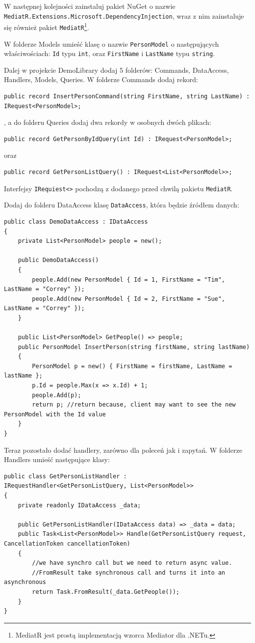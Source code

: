 W następnej kolejności zainstaluj pakiet NuGet o nazwie \texttt{MediatR.Extensions.Microsoft.DependencyInjection}, wraz z nim zainstaluje się również pakiet \texttt{MediatR}\footnote{MediatR jest prostą implementacją wzorca Mediator dla .NETu.}.

W folderze Models umieść klasę o nazwie \texttt{PersonModel} o następujących właściwościach: \texttt{Id} typu \texttt{int}, oraz \texttt{FirstName} i \texttt{LastName} typu \texttt{string}.

Dalej w projekcie DemoLibrary dodaj 5 folderów: Commands, DataAccess, Handlers, Models, Queries. W folderze Commands dodaj rekord:
\begin{lstlisting}
public record InsertPersonCommand(string FirstName, string LastName) : IRequest<PersonModel>;
\end{lstlisting}
, a do folderu Queries dodaj dwa rekordy w osobnych dwóch plikach:
\begin{lstlisting}
public record GetPersonByIdQuery(int Id) : IRequest<PersonModel>;
\end{lstlisting}
oraz
\begin{lstlisting}
public record GetPersonListQuery() : IRequest<List<PersonModel>>;
\end{lstlisting}
Interfejsy \texttt{IRequiest<>} pochodzą z dodanego przed chwilą pakietu \texttt{MediatR}.

Dodaj do folderu DataAccess klasę \texttt{DataAccess}, która będzie źródłem danych:
\begin{lstlisting}
public class DemoDataAccess : IDataAccess
{
	private List<PersonModel> people = new();
	
	public DemoDataAccess()
	{
		people.Add(new PersonModel { Id = 1, FirstName = "Tim", LastName = "Correy" });
		people.Add(new PersonModel { Id = 2, FirstName = "Sue", LastName = "Correy" });
	}
	
	public List<PersonModel> GetPeople() => people;
	public PersonModel InsertPerson(string firstName, string lastName)
	{
		PersonModel p = new() { FirstName = firstName, LastName = lastName };
		p.Id = people.Max(x => x.Id) + 1;
		people.Add(p);
		return p; //return because, client may want to see the new PersonModel with the Id value
	}
}
\end{lstlisting}

Teraz pozostało dodać handlery, zarówno dla poleceń jak i zapytań. W folderze Handlers umieść następujące klasy:
\begin{lstlisting}
public class GetPersonListHandler : IRequestHandler<GetPersonListQuery, List<PersonModel>>
{
	private readonly IDataAccess _data;
	
	public GetPersonListHandler(IDataAccess data) => _data = data;
	public Task<List<PersonModel>> Handle(GetPersonListQuery request, CancellationToken cancellationToken)
	{
		//we have synchro call but we need to return async value.
		//FromResult take synchronous call and turns it into an asynchronous 
		return Task.FromResult(_data.GetPeople());
	}
}
\end{lstlisting}

